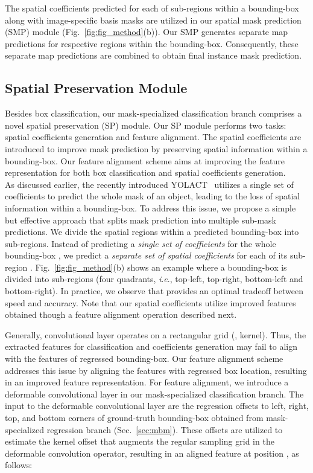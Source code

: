 \documentclass[runningheads]{llncs}
\newcommand{\ie}{\textit{i}.\textit{e}.}
\begin{document}
The spatial coefficients predicted for each of  sub-regions within a bounding-box along with image-specific basis masks are utilized in our spatial mask prediction (SMP) module (Fig.~\ref{fig:fig_method}(b)). Our SMP generates separate map predictions for respective regions within the bounding-box. Consequently, these separate map predictions are combined to obtain final instance mask prediction. 

\subsection{Spatial Preservation Module} \label{sec:sp}
Besides box classification, our mask-specialized classification branch comprises a novel spatial preservation (SP) module. Our SP module performs two tasks: spatial coefficients generation and feature alignment. 
The spatial coefficients are introduced to improve mask prediction by preserving spatial information  within a bounding-box. 
Our feature alignment scheme aims at improving the feature representation for both box classification and spatial coefficients generation.\\
As discussed earlier, the recently introduced YOLACT~\cite{Bolya_YOLACT_ICCV_2019} utilizes a single set of coefficients to predict the whole mask of an object, leading to the loss of spatial information within a bounding-box.
To address this issue, we propose a simple but effective approach that splits mask prediction into multiple sub-mask predictions. We divide the spatial regions within a predicted bounding-box into  sub-regions. Instead of predicting a \textit{\textit{single} set of coefficients}  for the whole bounding-box , we predict a \textit{separate set of spatial coefficients}  for each of its sub-region . Fig.~\ref{fig:fig_method}(b) shows an example where a bounding-box is divided into  sub-regions (four quadrants, \ie, top-left, top-right, bottom-left and bottom-right). In practice, we observe that  provides an optimal tradeoff between speed and accuracy. Note that our spatial coefficients utilize improved features obtained though a feature alignment operation described next. 

 Generally, convolutional layer operates  on a rectangular grid (\eg,  kernel). Thus, the extracted features for classification and coefficients generation may fail to align with the features of regressed bounding-box. Our feature alignment scheme addresses this issue by  aligning  the features with regressed box location, resulting in an improved feature representation. For feature alignment, we introduce a deformable convolutional layer \cite{Dai_DCN_ICCV_2017,Yang_DenseRepPoints_ECCV_2020,Cao_HSD_ICCV_2019} in our mask-specialized classification branch. The input to the deformable convolutional layer are the regression offsets to left, right, top, and bottom corners of ground-truth bounding-box  obtained from mask-specialized regression branch (Sec.~\ref{sec:mbm}). These offsets are utilized to estimate the kernel offset  that augments the regular sampling grid  in  the deformable convolution operator, resulting in an aligned feature  at position , as follows:
\end{document}
